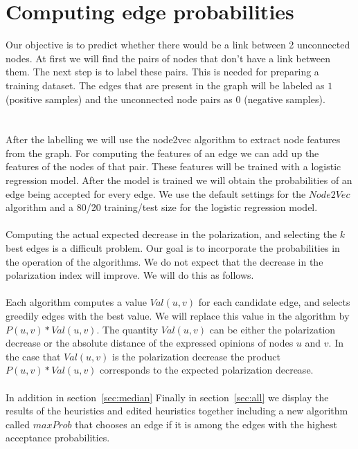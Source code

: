 \section{Computing edge probabilities }		
\label{sec:computingEdge}		
\vspace{20pt}
Our objective is to predict whether there would be a link between 2 unconnected nodes. At first we will find the pairs of nodes that don't have a link between them.	
The next step is to label these pairs. This is needed for preparing a training dataset. 
The edges that are present in the graph will be labeled as $1$ (positive samples) and the unconnected node pairs as $0$ (negative samples).		
\\
\\
\\
\noindent After the labelling we will use the node2vec algorithm to extract node features from the graph. For computing the features of an edge we can add up the features of the nodes of that pair. These features will be trained with a logistic regression model. After the model is trained we will obtain the probabilities of an edge being accepted for every edge. We use the default settings for the $Node2Vec$ algorithm and a 80/20 training/test size for the logistic regression model.
\\
\\
\noindent Computing the actual expected decrease in the polarization, and selecting the $k$ best edges is a difficult problem. Our goal is to incorporate the probabilities in the operation of the algorithms. We do not expect that the decrease in the polarization index will improve. We will do this as follows. 
\\
\\
Each algorithm computes a value $Val(u,v)$ for each candidate edge, and selects greedily edges with the best value. We will replace this value in the algorithm by $P(u,v)*Val(u,v)$. The quantity $Val(u,v)$ can be either the polarization decrease or the absolute distance of the expressed opinions of nodes $u$ and $v$. In the case that $Val(u,v)$ is the polarization decrease the product $P(u,v)*Val(u,v)$ corresponds to the expected polarization decrease.
\\
\\
In addition in section~\ref{sec:median}  Finally in section~\ref{sec:all} we display the results of the heuristics and edited heuristics together including a new algorithm called $maxProb$ that chooses an edge if it is among the edges with the highest acceptance probabilities.

\clearpage

